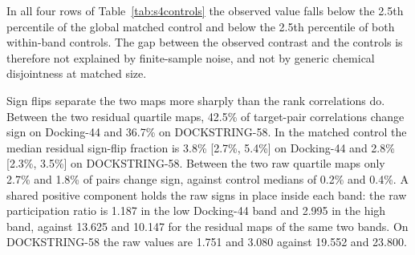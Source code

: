 \begin{table}[htbp]
\centering
\caption{Residual-map agreement across molecular-weight bands, against size-matched
whole-group-disjoint controls. The observed column is one fixed quartile contrast. Control
entries are medians with central 95\% repeated-split ranges over 200 group assignments; they
are composition-sensitivity ranges, not confidence intervals. Sources:
\protect{},
\protect{} and
\protect{}.}
\label{tab:s4controls}
\small
{}
\end{table}

In all four rows of Table~\ref{tab:s4controls} the observed value falls below the 2.5th
percentile of the global matched control and below the 2.5th percentile of both within-band
controls. The gap between the observed contrast and the controls is therefore not explained by
finite-sample noise, and not by generic chemical disjointness at matched size.

Sign flips separate the two maps more sharply than the rank correlations do. Between the two
residual quartile maps, 42.5\% of target-pair correlations change sign on Docking-44 and
36.7\% on DOCKSTRING-58. In the matched control the median residual sign-flip fraction is
3.8\% [2.7\%, 5.4\%] on Docking-44 and 2.8\% [2.3\%, 3.5\%] on DOCKSTRING-58. Between the two
raw quartile maps only 2.7\% and 1.8\% of pairs change sign, against control medians of 0.2\%
and 0.4\%. A shared positive component holds the raw signs in place inside each band: the raw
participation ratio is 1.187 in the low Docking-44 band and 2.995 in the high band, against
13.625 and 10.147 for the residual maps of the same two bands. On DOCKSTRING-58 the raw values
are 1.751 and 3.080 against 19.552 and 23.800.

